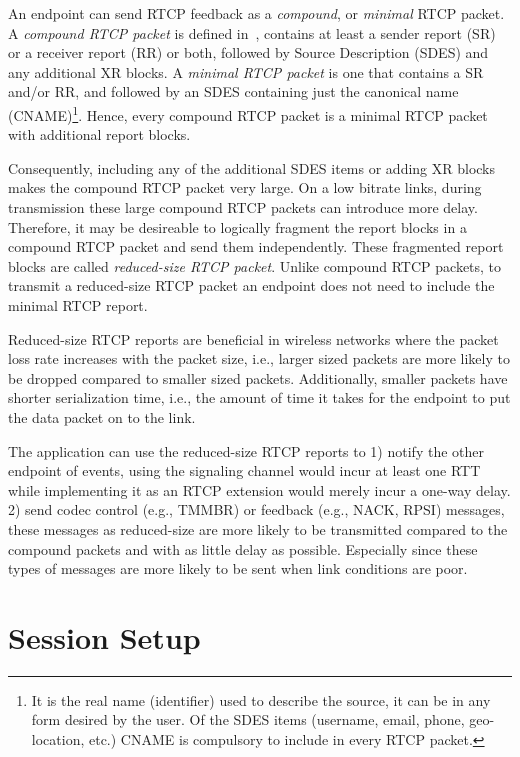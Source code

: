 An endpoint can send RTCP feedback as a \emph{compound}, or \emph{minimal}
RTCP packet. A \emph{compound RTCP packet} is defined in~\cite{rfc3585},
contains at least a sender report (SR) or a receiver report (RR) or both,
followed by Source Description (SDES) and any additional XR blocks. A
\emph{minimal RTCP packet} is one that contains a SR and/or RR, and followed
by an SDES containing just the canonical name (CNAME)\footnote{It is the real
name (identifier) used to describe the source, it can be in any form desired
by the user. Of the SDES items (username, email, phone, geo-location, etc.)
CNAME is compulsory to include in every RTCP packet.}. Hence, every compound
RTCP packet is a minimal RTCP packet with additional report blocks.

Consequently, including any of the additional SDES items or adding XR blocks
makes the compound RTCP packet very large. On a low bitrate links, during
transmission these large compound RTCP packets can introduce more delay.
Therefore, it may be desireable to logically fragment the report blocks in a
compound RTCP packet and send them independently. These fragmented report
blocks are called \emph{reduced-size RTCP packet}. Unlike compound RTCP
packets, to transmit a reduced-size RTCP packet an endpoint does not need to
include the minimal RTCP report. 

Reduced-size RTCP reports are beneficial in wireless networks where the packet
loss rate increases with the packet size, i.e., larger sized packets are more
likely to  be dropped compared to smaller sized packets. Additionally, smaller
packets have shorter serialization time, i.e., the amount of time it takes for
the endpoint to put the data packet on to the link.

The application can use the reduced-size RTCP reports to 1) notify the other
endpoint of events, using the signaling channel would incur at least one RTT
while implementing it as an RTCP extension would merely incur a one-way delay.
2) send codec control (e.g., TMMBR) or feedback (e.g., NACK, RPSI) messages,
these messages as reduced-size are more likely to be transmitted compared to
the compound packets and with as little delay as possible. Especially since
these types of messages are more likely to be sent when link conditions are
poor.


\section{Session Setup}

